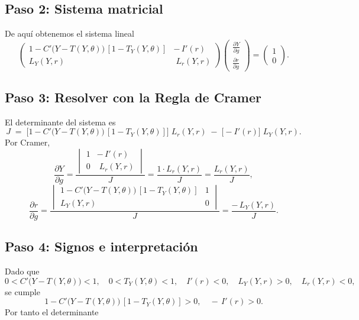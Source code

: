 \documentclass{article}
\begin{document}
\subsection*{Paso 2: Sistema matricial}
De aquí obtenemos el sistema lineal
\[
\begin{pmatrix}
1 - C'\bigl(Y - T(Y,\theta)\bigr)\,[1 - T_Y(Y,\theta)] & -\,I'(r) \\[6pt]
L_Y(Y,r)                                              & \;L_r(Y,r)
\end{pmatrix}
\begin{pmatrix}
\displaystyle \frac{\partial Y}{\partial g} \\[4pt]
\displaystyle \frac{\partial r}{\partial g}
\end{pmatrix}
=
\begin{pmatrix}
1 \\[4pt]
0
\end{pmatrix}.
\]

\subsection*{Paso 3: Resolver con la Regla de Cramer}

El determinante del sistema es
\[
J \;=\;
\bigl[1 - C'\bigl(Y - T(Y,\theta)\bigr)\,[1 - T_Y(Y,\theta)]\bigr]\;L_r(Y,r)
\;-\;\bigl[-I'(r)\bigr]\;L_Y(Y,r).
\]
Por Cramer,
\[
\frac{\partial Y}{\partial g}
= \frac{
\begin{vmatrix}
1 & -\,I'(r) \\[4pt]
0 & \;L_r(Y,r)
\end{vmatrix}
}{J}
= \frac{1\cdot L_r(Y,r)}{J}
= \frac{L_r(Y,r)}{J},
\]
\[
\frac{\partial r}{\partial g}
= \frac{
\begin{vmatrix}
1 - C'\bigl(Y - T(Y,\theta)\bigr)\,[1 - T_Y(Y,\theta)] & 1 \\[4pt]
L_Y(Y,r)                                              & 0
\end{vmatrix}
}{J}
= \frac{-\,L_Y(Y,r)}{J}.
\]

\subsection*{Paso 4: Signos e interpretación}

Dado que
\[
0 < C'\bigl(Y - T(Y,\theta)\bigr) < 1,
\quad
0 < T_Y(Y,\theta) < 1,
\quad
I'(r) < 0,
\quad
L_Y(Y,r) > 0,
\quad
L_r(Y,r) < 0,
\]
se cumple
\[
1 - C'\bigl(Y - T(Y,\theta)\bigr)\,[1 - T_Y(Y,\theta)] > 0,
\quad
-\,I'(r) > 0.
\]
Por tanto el determinante
\end{document}
